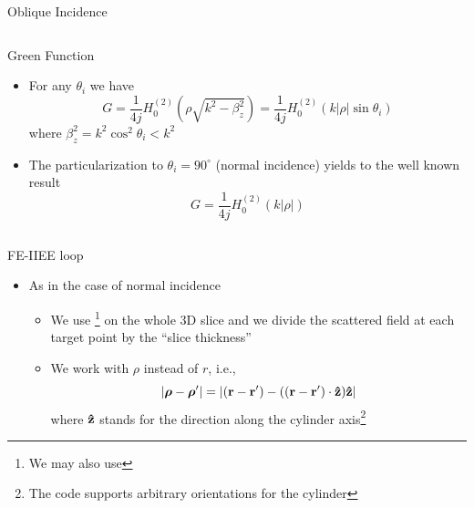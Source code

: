 \begin{frame}[allowframebreaks]{Oblique Incidence}
\begin{columns}
     \centering
    \begin{block}{Green Function}
      \begin{itemize}
      \item For any  $\theta_i$ we have
        \begin{equation*}
          G = \dfrac{1}{4j} H_0^{(2)}\left( \rho\sqrt{k^2-\beta_z^2}\right) 
          = \dfrac{1}{4j} H_0^{(2)}\left( k|\rho|\sin\theta_i\right)
        \end{equation*}
      where $\beta_z^2=k^2\cos^2\theta_i < k^2$
        
      \item The particularization to $\theta_i=90^\circ$ (normal
        incidence) yields to the well known result
        \begin{equation*}
          G = \dfrac{1}{4j} H_0^{(2)}(k|\rho|)
        \end{equation*}
        
      \end{itemize}
    \end{block}
  \end{columns}
  
    \framebreak %

    
    \begin{block}{FE-IIEE loop}
      \begin{itemize}
      \item As in the case of normal incidence
        \begin{itemize}
        \item We use {\GreenD}\footnote{We may also use {\GreenTEw}}
          on the whole 3D slice and we divide  the scattered field
          at each target point by the ``slice thickness''

        \item We work with $\rho$ instead of $r$, i.e.,
          \begin{equation*}
            |\boldsymbol{\rho}-\boldsymbol{\rho}^\prime|=|(\mathbf{r}-\mathbf{r^\prime})-((\mathbf{r}-\mathbf{r^\prime})\cdot\mathbf{\hat{z}})\mathbf{\hat{z}}|
          \end{equation*}
          where $\mathbf{\hat{z}}$ stands for the direction along the cylinder
          axis\footnote{The code supports arbitrary orientations for the
            cylinder}
        \end{itemize}


\end{itemize}
\end{block}
\end{frame}
